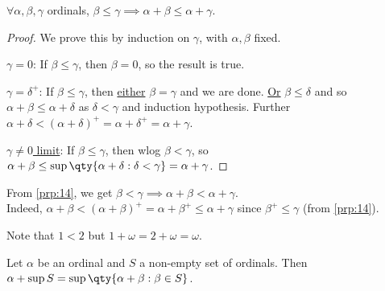 \begin{proposition} \label{prp:14}
    $\forall \alpha, \beta, \gamma$ ordinals, $\beta \leq \gamma \implies \alpha + \beta \leq \alpha + \gamma$.
\end{proposition}

\begin{proof}
    We prove this by induction on $\gamma$, with $\alpha, \beta$ fixed.

    \underline{$\gamma = 0$}: If $\beta \leq \gamma$, then $\beta = 0$, so the result is true.

    \underline{$\gamma = \delta^+$}: If $\beta \leq \gamma$, then \underline{either} $\beta = \gamma$ and we are done.
    \underline{Or} $\beta \leq \delta$ and so $\alpha + \beta \leq \alpha + \delta$ as $\delta < \gamma$ and induction hypothesis.
    Further $\alpha + \delta < (\alpha + \delta)^+ = \alpha + \delta^+ = \alpha + \gamma$.

    \underline{$\gamma \neq 0$ limit}: If $\beta \leq \gamma$, then wlog $\beta < \gamma$, so $\alpha + \beta \leq \sup \qty{\alpha + \delta : \delta < \gamma} = \alpha + \gamma$.
\end{proof}

\begin{remark}
    From \cref{prp:14}, we get $\beta < \gamma \implies \alpha + \beta < \alpha + \gamma$. \\
    Indeed, $\alpha + \beta < (\alpha + \beta)^+ = \alpha + \beta^+ \leq \alpha + \gamma$ since $\beta^+ \leq \gamma$ (from \cref{prp:14}).

    Note that $1 < 2$ but $1 + \omega = 2 + \omega = \omega$.
\end{remark}

\begin{lemma} \label{lem:15}
    Let $\alpha$ be an ordinal and $S$ a non-empty set of ordinals.
    Then $\alpha + \sup S = \sup \qty{\alpha + \beta : \beta \in S}$.
\end{lemma}

